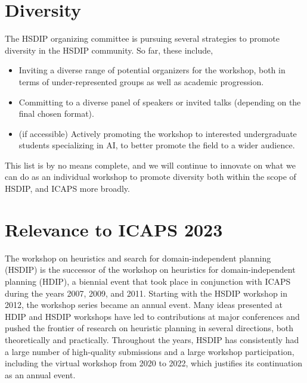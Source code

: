 \documentclass[10pt]{article}
\begin{document}
\section*{Diversity}
The HSDIP organizing committee is pursuing several strategies to promote
diversity in the HSDIP community. So far, these include,

\begin{itemize}
  \item Inviting a diverse range of potential organizers for the workshop,
  both in terms of under-represented groups as well as academic progression.
  \item Committing to a diverse panel of speakers or invited talks (depending
  on the final chosen format).
  \item (if accessible) Actively promoting the workshop to interested undergraduate
  students specializing in AI, to better promote the field to a wider audience.
\end{itemize}

This list is by no means complete, and we will continue to innovate on what
we can do as an individual workshop to promote diversity both within the scope
of HSDIP, and ICAPS more broadly.






\section*{Relevance to ICAPS 2023}

The workshop on heuristics and search for domain-independent planning (HSDIP) is
the successor of the workshop on heuristics for domain-independent planning
(HDIP), a biennial event that took place in conjunction with ICAPS during the
years 2007, 2009, and 2011. Starting with the HSDIP workshop in 2012, the
workshop series became an annual event.
Many ideas presented at HDIP and HSDIP workshops have led to contributions at major
conferences and pushed the frontier of research on heuristic planning in several
directions, both theoretically and practically. Throughout the years, HSDIP has
consistently had a large number of high-quality submissions and a large workshop
participation, including the virtual workshop from 2020 to 2022, which justifies its
continuation as an annual event.
\end{document}
